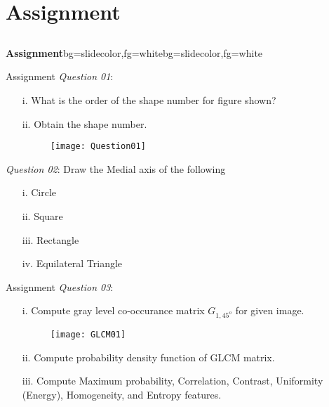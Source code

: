 \section{Assignment}
\subsection{}
\begin{frame}{}
\begin{variableblock}{\centering \Large \textbf{\vspace{4pt}\newline Assignment\vspace{4pt}}}{bg=slidecolor,fg=white}{bg=slidecolor,fg=white}
\end{variableblock}
\end{frame}

\begin{frame}{Assignment}
\textit{\color{slidecolor}Question 01}:
\begin{itemize}
\item[i.] What is the order of the shape number for figure shown?
\item[ii.] Obtain the shape number.
\begin{figure}
\texttt{[image: Question01]}
\end{figure}
\end{itemize}
\textit{\color{slidecolor}Question 02}: Draw the Medial axis of the following
\begin{itemize}
\item[i.] Circle
\item[ii.] Square
\item[iii.] Rectangle
\item[iv.] Equilateral Triangle
\end{itemize}
\end{frame}

\begin{frame}{Assignment}
\textit{\color{slidecolor}Question 03}:
\begin{itemize}
\item[i.] Compute gray level co-occurance matrix $G_{1,45^o}$ for given image.
\begin{figure}
\texttt{[image: GLCM01]}
\end{figure}
\item[ii.] Compute probability density function of GLCM matrix.
\item[iii.] Compute Maximum probability, Correlation, Contrast, Uniformity (Energy), Homogeneity, and Entropy features.
\end{itemize}
\end{frame}

